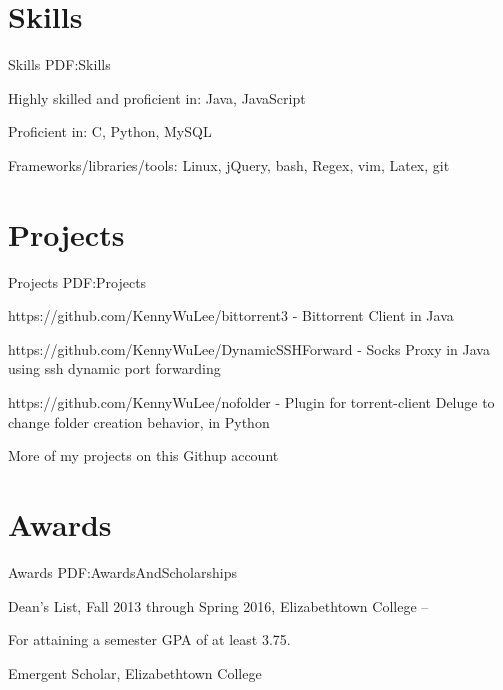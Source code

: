 \documentclass[letterpaper,MMMyyyy,nonstop]{simpleresumecv}
\begin{document}
\begin{body}
\bigskip


\section
{Skills}
{Skills}
{PDF:Skills}

\BulletItem
Highly skilled and proficient in: Java, JavaScript

\Gap
\BulletItem
Proficient in: C, Python, MySQL

\Gap
\BulletItem
Frameworks/libraries/tools: Linux, jQuery, bash, Regex, vim, Latex, git


\bigskip


\section
{Projects}
{Projects}
{PDF:Projects}

\BulletItem
https://github.com/KennyWuLee/bittorrent3 - Bittorrent Client in Java

\Gap
\BulletItem
https://github.com/KennyWuLee/DynamicSSHForward - Socks Proxy in Java using ssh dynamic port forwarding

\Gap
\BulletItem
https://github.com/KennyWuLee/nofolder - Plugin for torrent-client Deluge to change folder creation behavior, in Python

\Gap
\BulletItem
More of my projects on this Githup account


\bigskip


\section
{Awards}
{Awards}
{PDF:AwardsAndScholarships}

\BulletItem
Dean's List,
Fall 2013 through Spring 2016,
Elizabethtown College
\hfill
{} --
\begin{detail}
\SubItem
For attaining a semester GPA of at least 3.75.
\end{detail}

\Gap
\BulletItem
Emergent Scholar,
Elizabethtown College
\hfill
{}

\end{body}
\end{document}

